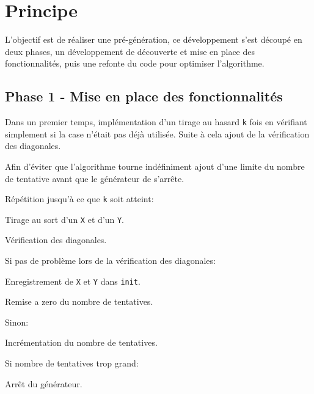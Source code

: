 \documentclass[a4paper, 10pt]{article}
\begin{document}
		\section{Principe}
            L'objectif est de réaliser une pré-génération, ce développement s'est découpé en deux phases, un développement de découverte et mise en place des fonctionnalités, puis une refonte du code pour optimiser l'algorithme.

            \subsection{Phase 1 - Mise en place des fonctionnalités}
                Dans un premier temps, implémentation d'un tirage au hasard \verb?k? fois en vérifiant simplement si la case n'était pas déjà utilisée. Suite à cela ajout de la vérification des diagonales.

                Afin d'éviter que l'algorithme tourne indéfiniment ajout d'une limite du nombre de tentative avant que le générateur de s'arrête.

                \begin{description}
                    \item Répétition jusqu'à ce que \verb?k? soit atteint:
                    \begin{description}
                        \item Tirage au sort d'un \verb?X? et d'un \verb?Y?.
                        \item Vérification des diagonales.
                        \item Si pas de problème lors de la vérification des diagonales:
                        \begin{description}
                            \item Enregistrement de \verb?X? et \verb?Y? dans \verb?init?.
                            \item Remise a zero du nombre de tentatives.
                        \end{description}
                        \item Sinon:
                        \begin{description}
                            \item Incrémentation du nombre de tentatives.
                            \item Si nombre de tentatives trop grand:
                            \begin{description}
                                \item Arrêt du générateur.
                            \end{description}
                        \end{description}
                    \end{description}
                \end{description}
\end{document}
